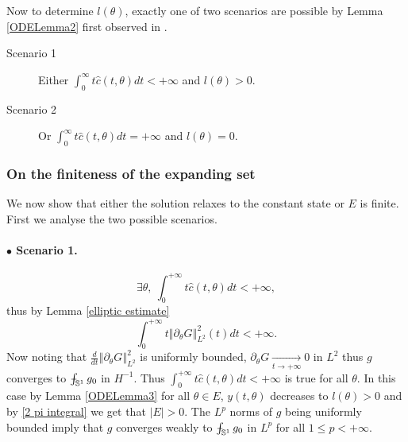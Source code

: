 \documentclass[10pt]{article}
\numberwithin{equation}{section}
\theoremstyle{plain}
\theoremstyle{definition}
\newcommand{\norm}[1]{\left\Vert #1 \right\Vert}
\def\Xint#1{\mathchoice
{\XXint\displaystyle\textstyle{#1}}%
{\XXint\textstyle\scriptstyle{#1}}%
{\XXint\scriptstyle\scriptscriptstyle{#1}}%
{\XXint\scriptscriptstyle\scriptscriptstyle{#1}}%
\!\int}
\def\XXint#1#2#3{{\setbox0=\hbox{$#1{#2#3}{\int}$ }
\vcenter{\hbox{$#2#3$ }}\kern-.6\wd0}}
\def\dashint{\Xint-}
\numberwithin{equation}{section}
\begin{document}
Now to determine $l(\theta)$, exactly one of two scenarios are possible by Lemma \ref{ODELemma2} first observed in \cite{Sobol49}.
\begin{description}
\item[Scenario 1] Either $\int_0^{\infty}t\hat{c}(t,\theta)dt<+\infty$  and $l(\theta)>0$.
\item[Scenario 2] Or $\int_0^{\infty}t\hat{c}(t,\theta)dt=+\infty$ and $l(\theta)=0$.
\end{description}

\subsubsection{On the finiteness of the expanding set}\label{sub sec:cvg to steady state}

We now show that either the solution relaxes to the constant state or $E$ is finite. First we analyse the two possible scenarios.
\paragraph{\textbf{$\bullet$ Scenario 1.}}
\[
\exists \theta, \ \int_0^{+\infty}t\hat{c}(t,\theta)dt<+\infty,
\]
thus by Lemma \ref{elliptic estimate}
\[
\int_0^{+\infty}t\norm{\partial_\theta G}_{L^2}^2(t)dt<+\infty.
\]
Now noting that $\frac{d}{dt}\norm{\partial_\theta G}_{L^2}^2$ is uniformly bounded, $\partial_\theta G\underset{t\rightarrow +\infty}{\longrightarrow}0$ in $L^2$ thus $g$ converges to $\dashint_{\mathbb{S}^1}g_0$ in $H^{-1}$. Thus $\int_0^{+\infty}t\hat{c}(t,\theta)dt<+\infty$ is true for all $\theta$. In this case by Lemma \ref{ODELemma3} for all $\theta\in E$, $y(t,\theta)$ decreases to $l(\theta)>0$ and by \eqref{2 pi integral} we get that $|E|>0.$ The $L^p$ norms of $g$ being uniformly bounded imply that $g$ converges weakly to $\dashint_{\mathbb{S}^1}g_0$ in $L^p$ for all $1\leq p<+\infty$.
\end{document}
